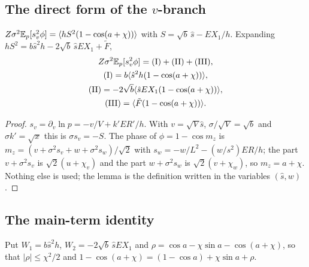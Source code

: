 \subsection{The direct form of the $v$-branch}

\begin{lemma} \proofst
\label{lem:CZ1}
$Z\sigma^2\mathbb{E}_p[s_v^2\phi]=\langle hS^2(1-\cos(a+\chi))\rangle$ with $S=\sqrt b\,\hat s-EX_1/h$. Expanding $hS^2=b\hat s^2h-2\sqrt b\,\hat sEX_1+\tilde F$,
\begin{gather}
Z\sigma^2\mathbb{E}_p[s_v^2\phi]=\mathrm{(I)}+\mathrm{(II)}+\mathrm{(III)},\nonumber\\
\mathrm{(I)}=b\langle\hat s^2h(1-\cos(a+\chi))\rangle,\nonumber\\ \mathrm{(II)}=-2\sqrt b\langle\hat sEX_1(1-\cos(a+\chi))\rangle,\nonumber\\
\mathrm{(III)}=\langle\tilde F(1-\cos(a+\chi))\rangle .
\end{gather}
\end{lemma}
\begin{proof}
$s_v=\partial_v\ln p=-v/V+k'ER'/h$. With $v=\sqrt V\hat s$, $\sigma/\sqrt V=\sqrt b$ and $\sigma k'=\sqrt x$ this is $\sigma s_v=-S$.
The phase of $\phi=1-\cos m_z$ is $m_z=(v+\sigma^2s_v+w+\sigma^2s_w)/\sqrt2$ with $s_w=-w/L^2-(w/s^2)ER/h$; the part $v+\sigma^2s_v$ is $\sqrt2(u+\chi_v)$ and the part $w+\sigma^2s_w$ is $\sqrt2(v+\chi_w)$, so $m_z=a+\chi$.
Nothing else is used; the lemma is the definition written in the variables $(\hat s,w)$.
\end{proof}

\subsection{The main-term identity}

Put $W_1=b\hat s^2h$, $W_2=-2\sqrt b\,\hat sEX_1$ and $\rho=\cos a-\chi\sin a-\cos(a+\chi)$, so that $|\rho|\le\chi^2/2$ and $1-\cos(a+\chi)=(1-\cos a)+\chi\sin a+\rho$.

